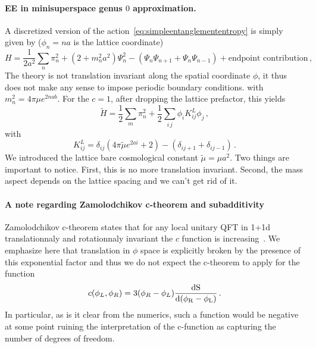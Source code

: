 \documentclass[a4paper]{article}
\begin{document}
\paragraph{EE in minisuperspace genus $0$ approximation.}
A discretized version of the action~\eqref{eq:simpleentanglemententropy} is simply given by ($\phi_n=n a$ is the lattice coordinate)
\begin{equation}
  H = \frac{1}{2a^2}\sum_n \pi_n^2 +(2+m_n^2 a^2)\Psi_n^2 -(\Psi_n\Psi_{n+1}+\Psi_n\Psi_{n-1})+\text{endpoint contribution}\,,
\end{equation}
The theory is not translation invariant along the spatial coordinate $\phi$, it thus does not make any sense to impose periodic boundary conditions.
with $m_n^2 = 4\pi \mu e^{2 n a b}$. For the $c=1$, after dropping the lattice prefactor, this yields
\begin{equation}
  \tilde{H} = \frac{1}{2}\sum_m \pi_n^2 + \frac{1}{2}\sum_{i\,j}\phi_i K^{L}_{ij}\phi_j\,,
\end{equation}
with
\begin{equation}
  K^{L}_{ij}= \delta_{ij}\left(4\pi \tilde{\mu} e^{2 a i} + 2\right)-\left(\delta_{i j+1}+ \delta_{i j-1}\right)\,.
\end{equation}
We introduced the lattice bare cosmological constant $\tilde{\mu} = \mu a^2$. Two things are important to notice. First, this is no more translation invariant. Second, the mass aspect depends on the lattice spacing and we can't get rid of it.
\paragraph{A note regarding Zamolodchikov c-theorem and subadditivity}
Zamolodchikov c-theorem states that for any local unitary QFT in 1+1d translationnaly and rotationnaly invariant the $c$ function is increasing~\cite{Zamolodchikov:1986gt}\cite{Casini_2007}. We emphasize here that translation in $\phi$ space is explicitly broken by the presence of this exponential factor and thus we do not expect the c-theorem to apply for the function
\begin{equation}
  c(\phi_L,\phi_R) = 3(\phi_R-\phi_L)\frac{\rm{d} S}{\rm{d}(\phi_R -\phi_L)}\,.
\end{equation}
In particular, as is it clear from the numerics, such a function would be negative at some point ruining the interpretation of the c-function as capturing the number of degrees of freedom.
\end{document}
